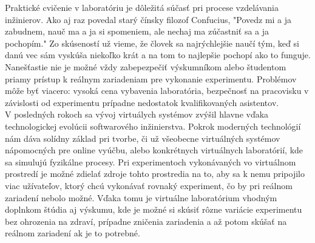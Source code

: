 \indent Praktické cvičenie v laboratóriu je dôležitá súčasť pri procese vzdelávania inžinierov. Ako aj raz povedal starý čínsky filozof Confucius, "Povedz mi a ja zabudnem, nauč ma a ja si spomeniem, ale nechaj ma zúčastniť sa a ja pochopím." Zo skúseností už vieme, že človek sa najrýchlejšie naučí tým, keď si danú vec sám vyskúša niekoľko krát a na tom to najlepšie pochopí ako to funguje. Nanešťastie nie je možné vždy zabepezpečiť výskumníkom alebo študentom priamy prístup k reálnym zariadeniam pre vykonanie experimentu. Problémov môže byť viacero: vysoká cena vybavenia laboratória, bezpečnosť na pracovisku v závislosti od experimentu prípadne nedostatok kvalifikovaných asistentov.\\
\indent V posledných rokoch sa vývoj virtuálych systémov zvýšil hlavne vďaka technologickej evolúcii softwarového inžinierstva. Pokrok moderných technológií nám dáva solídny základ pri tvorbe, či už všeobecne virtuálných systémov nápomocných pre online vyúčbu, alebo konkrétnych virtuálnych laboratórií, kde sa simulujú fyzikálne procesy. Pri experimentoch vykonávaných vo virtuálnom prostredí je možné zdielať zdroje tohto prostredia na to, aby sa k nemu pripojilo viac užívateľov, ktorý chcú vykonávať rovnaký experiment, čo by pri reálnom zariadení nebolo možné. Vďaka tomu je virtuálne laboratórium vhodným doplnkom štúdia aj výskumu, kde je možné si skúsiť rôzne variácie experimentu bez ohrozenia na zdraví, prípadne zničenia zariadenia a až potom skúšať na reálnom zariadení ak je to potrebné.\\